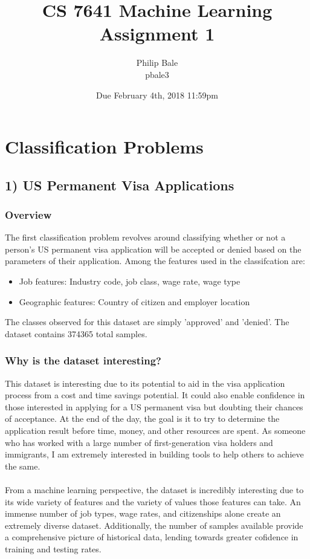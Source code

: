 \documentclass[h]{article}
\title{CS 7641 Machine Learning \\ Assignment 1}
\date{Due February 4th, 2018 11:59pm}
\author{Philip Bale \\ pbale3}
\begin{document}
\maketitle

\section*{Classification Problems}
\subsection*{1) US Permanent Visa Applications}  
\subsubsection*{Overview}
The first classification problem revolves around classifying whether or not a 
person's US permanent visa application will be accepted or denied based on the parameters of 
their application.  Among the features used in the classifcation are:
\begin{itemize}
  \item Job features: Industry code, job class, wage rate, wage type
  \item Geographic features: Country of citizen and employer location
\end{itemize}
The classes observed for this dataset are simply 'approved' and 'denied'.  The 
dataset contains 374365 total samples.
\subsubsection*{Why is the dataset interesting?}
This dataset is interesting due to its potential to aid in the visa application 
process from a cost and time savings potential.  It could also enable confidence in those 
interested in applying for a US permanent visa but doubting their chances of 
acceptance.  At the end of the day, the goal is it to try to determine the application result 
before time, money, and other resources are spent.  As someone who has worked 
with a large number of first-generation visa holders and immigrants, I am 
extremely interested in building tools to help others to achieve the same.
\\ \\
From a machine learning perspective, the dataset is incredibly interesting due 
to its wide variety of features and the variety of values those features can take. 
 An immense number of job types, wage rates, and citizenships alone create an 
 extremely diverse dataset.  Additionally, the number of samples available 
 provide a comprehensive picture of historical data, lending towards greater 
 cofidence in training and testing rates.
\end{document}

